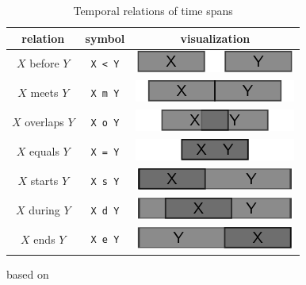 \begin{table}[H]
\begin{center}
\begin{tabular}{c c c}
    \toprule
    relation & symbol & visualization \\
    \midrule
    $X$ before $Y$ &    \texttt{X < Y} & \raisebox{-0.25\height}
    {\includegraphics{graphics/basics/temporal_relations/before}} \\
    $X$ meets $Y$ &     \texttt{X m Y} & \raisebox{-0.25\height}
    {\includegraphics{graphics/basics/temporal_relations/meets}} \\
    $X$ overlaps $Y$ &  \texttt{X o Y} & \raisebox{-0.25\height}
    {\includegraphics{graphics/basics/temporal_relations/overlaps}} \\
    $X$ equals $Y$ &    \texttt{X = Y} & \raisebox{-0.25\height}
    {\includegraphics{graphics/basics/temporal_relations/equals}} \\
    $X$ starts $Y$ &    \texttt{X s Y} & \raisebox{-0.25\height}
    {\includegraphics{graphics/basics/temporal_relations/starts}} \\
    $X$ during $Y$ &    \texttt{X d Y} & \raisebox{-0.25\height}
    {\includegraphics{graphics/basics/temporal_relations/during}} \\
    $X$ ends $Y$ &      \texttt{X e Y} & \raisebox{-0.25\height}
    {\includegraphics{graphics/basics/temporal_relations/ends}} \\
    \bottomrule
\end{tabular}
\caption{Temporal relations of time spans}
\small{based on \cite{allen84theoryofactionandtime}}
\label{tab:temporal_relations}
\end{center}
\end{table}


